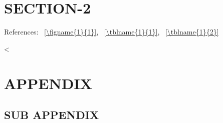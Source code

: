 \documentclass[12pt, lettersize]{article}
\begin{document}
\section{SECTION-2}
\lipsum[1]
\cite{smit54,colu92,gree00,phil99,jame76}

\noindent{}References:
\FIGURE~\ref{\figname{1}{1}},
\TABLE~\ref{\tblname{1}{1}},
\TABLE~\ref{\tblname{1}{2}}

\newpage
<%

\newpage
\appendix
\section{APPENDIX}
\lipsum[1]

\subsection{SUB APPENDIX}
\lipsum[1-2]

\end{document}
